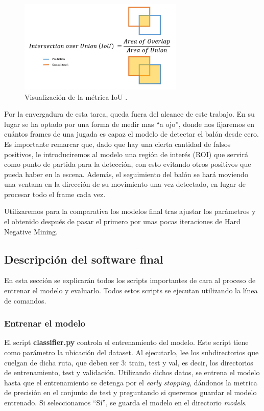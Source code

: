 \begin{figure}[H]
  \centering
  \includegraphics[width=0.7\textwidth]{images/IoU.jpg}
  \caption{Visualización de la métrica IoU \cite{kaggleIoU}.}
  \label{fig:IoU}
\end{figure}

Por la envergadura de esta tarea, queda fuera del alcance de este trabajo. En su lugar se ha optado por una forma de medir mas ``a ojo'', donde nos fijaremos en cuántos frames de una jugada es capaz el modelo de detectar el balón desde cero. Es importante remarcar que, dado que hay una cierta cantidad de falsos positivos, le introduciremos al modelo una región de interés (ROI) que servirá como punto de partida para la detección, con esto evitando otros positivos que pueda haber en la escena. Además, el seguimiento del balón se hará moviendo una ventana en la dirección de su movimiento una vez detectado, en lugar de procesar todo el frame cada vez.

Utilizaremos para la comparativa los modelos final tras ajustar los parámetros y el obtenido después de pasar el primero por unas pocas iteraciones de Hard Negative Mining.

\subsection{Descripción del software final}

En esta sección se explicarán todos los scripts importantes de cara al proceso de entrenar el modelo y evaluarlo. Todos estos scripts se ejecutan utilizando la línea de comandos.

\subsubsection*{Entrenar el modelo}

El script \textbf{classifier.py} controla el entrenamiento del modelo. Este script tiene como parámetro la ubicación del dataset. Al ejecutarlo, lee los subdirectorios que cuelgan de dicha ruta, que deben ser 3: train, test y val, es decir, los directorios de entrenamiento, test y validación. Utilizando dichos datos, se entrena el modelo hasta que el entrenamiento se detenga por el \textit{early stopping}, dándonos la metrica de precisión en el conjunto de test y preguntando si queremos guardar el modelo entrenado. Si seleccionamos ``Sí'', se guarda el modelo en el directorio \textit{models}.

